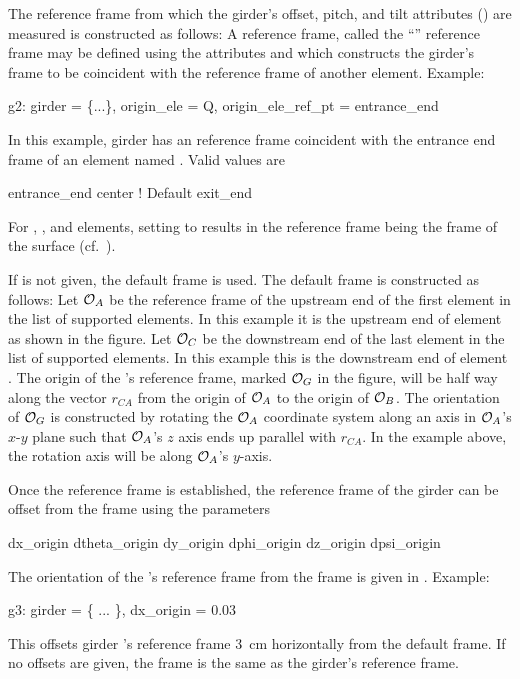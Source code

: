 The reference frame from which the girder's offset, pitch, and tilt
attributes () are measured is constructed as follows: A
reference frame, called the ``'' reference frame may be
defined using the attributes  and
 which constructs the girder's
 frame to be coincident with the reference frame of another
element. Example:
\begin{example}
  g2: girder = \{...\}, origin_ele = Q, origin_ele_ref_pt = entrance_end
\end{example}
In this example, girder  has an  reference frame
coincident with the entrance end frame of an element named
. Valid values are
\begin{example}
  entrance_end
  center        ! Default
  exit_end
\end{example}
For , , and  elements,
setting  to  results in the reference
frame being the frame of the surface (cf.~).

If  is not given, the default  frame is
used. The default  frame is constructed as follows:
Let ${\cal O}_A$ be the reference frame of the upstream end of
the first element in the list of supported elements. In this example
it is the upstream end of element  as shown in the figure. Let
${\cal O}_C$ be the downstream end of the last element in the list of
supported elements. In this example this is the downstream end of
element . The origin of the 's reference frame,
marked ${\cal O}_G$ in the figure, will be half way along the vector
$r_{CA}$ from the origin of ${\cal O}_A$ to the origin of ${\cal O}_B$.  The
orientation of ${\cal O}_G$ is constructed by rotating the ${\cal O}_A$
coordinate system along an axis in ${\cal O}_A$'s $x$-$y$ plane such that
${\cal O}_A$'s $z$ axis ends up parallel with $r_{CA}$. In the example
above, the rotation axis will be along ${\cal O}_A$'s $y$-axis.

Once the  reference frame is established, the reference
frame of the girder can be offset
from the  frame using the parameters
\begin{example}
  dx_origin    dtheta_origin
  dy_origin    dphi_origin
  dz_origin    dpsi_origin
\end{example} 
The orientation of the 's reference frame from the 
frame is given in . Example:
\begin{example}
  g3: girder = \{ ... \}, dx_origin = 0.03
\end{example}
This offsets girder 's reference frame 3~cm horizontally from
the default  frame. If no offsets are given, the
 frame is the same as the girder's reference frame.

